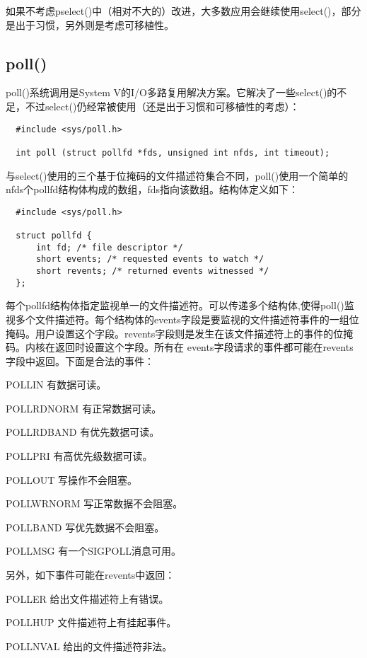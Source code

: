 如果不考虑pselect()中（相对不大的）改进，大多数应用会继续使用select()，部分是出于习惯，另外则是考虑可移植性。

\subsection{poll()}

poll()系统调用是System V的I/O多路复用解决方案。它解决了一些select()的不足，不过select()仍经常被使用（还是出于习惯和可移植性的考虑）：

\begin{lstlisting}
  #include <sys/poll.h>

  int poll (struct pollfd *fds, unsigned int nfds, int timeout);
\end{lstlisting}

与select()使用的三个基于位掩码的文件描述符集合不同，poll()使用一个简单的nfds个pollfd结构体构成的数组，fds指向该数组。结构体定义如下：

\begin{lstlisting}
  #include <sys/poll.h>

  struct pollfd {
      int fd; /* file descriptor */
      short events; /* requested events to watch */
      short revents; /* returned events witnessed */
  };
\end{lstlisting}

每个pollfd结构体指定监视单一的文件描述符。可以传递多个结构体,使得poll()监视多个文件描述符。每个结构体的events字段是要监视的文件描述符事件的一组位掩码。用户设置这个字段。revents字段则是发生在该文件描述符上的事件的位掩码。内核在返回时设置这个字段。所有在 events字段请求的事件都可能在revents字段中返回。下面是合法的事件： 

\begin{eqlist*}
\item [POLLIN]
有数据可读。 
\item [POLLRDNORM]
有正常数据可读。
\item [POLLRDBAND]
有优先数据可读。
\item [POLLPRI]
有高优先级数据可读。
\item [POLLOUT]
写操作不会阻塞。
\item [POLLWRNORM]
写正常数据不会阻塞。
\item [POLLBAND]
写优先数据不会阻塞。
\item [POLLMSG]
有一个SIGPOLL消息可用。
\end{eqlist*}

另外，如下事件可能在revents中返回： 

\begin{eqlist*}
\item [POLLER]
给出文件描述符上有错误。
\item [POLLHUP]
文件描述符上有挂起事件。
\item [POLLNVAL]
给出的文件描述符非法。
\end{eqlist*}

